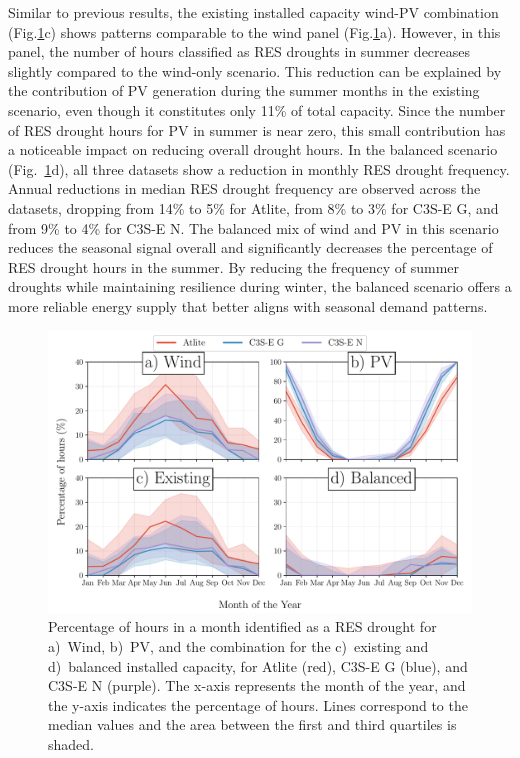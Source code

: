 \documentclass[a4paper, 11pt]{article}
\begin{document}
Similar to previous results, the existing installed capacity wind-PV combination (Fig.\ref{fig:res_droughts_seasonality}c) shows patterns comparable to the wind panel (Fig.\ref{fig:res_droughts_seasonality}a). However, in this panel, the number of hours classified as RES droughts in summer decreases slightly compared to the wind-only scenario. This reduction can be explained by the contribution of PV generation during the summer months in the existing scenario, even though it constitutes only 11\% of total capacity. Since the number of RES drought hours for PV in summer is near zero, this small contribution has a noticeable impact on reducing overall drought hours. In the balanced scenario (Fig.~\ref{fig:res_droughts_seasonality}d), all three datasets show a reduction in monthly RES drought frequency. Annual reductions in median RES drought frequency are observed across the datasets, dropping from 14\% to 5\% for Atlite, from 8\% to 3\% for C3S-E G, and from 9\% to 4\% for C3S-E N. The balanced mix of wind and PV in this scenario reduces the seasonal signal overall and significantly decreases the percentage of RES drought hours in the summer. By reducing the frequency of summer droughts while maintaining resilience during winter, the balanced scenario offers a more reliable energy supply that better aligns with seasonal demand patterns.

\begin{figure}[!ht]
	\centering
	\includegraphics[width=\textwidth]{droughts_seasonality}
	\caption{Percentage of hours in a month identified as a RES drought for a)~Wind, b)~PV, and the combination for the c)~existing and d)~balanced installed capacity, for Atlite (red), C3S-E G (blue), and C3S-E N (purple). The x-axis represents the month of the year, and the y-axis indicates the percentage of hours. Lines correspond to the median values and the area between the first and third quartiles is shaded.}
	\label{fig:res_droughts_seasonality}
\end{figure}
\end{document}
